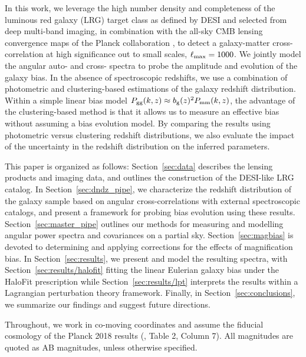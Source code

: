 In this work, we leverage the high number density and completeness of the luminous red galaxy (LRG) target class as defined by DESI and selected from deep multi-band imaging, in combination with the all-sky CMB lensing convergence maps of the Planck collaboration \citep{PlanckVIII}, to detect a galaxy-matter cross-correlation at high significance out to small scales, $\ell_{\rm max} = 1000$. We jointly model the angular auto- and cross- spectra to probe the amplitude and evolution of the galaxy bias. In the absence of spectroscopic redshifts, we use a combination of photometric and clustering-based estimations of the galaxy redshift distribution. Within a simple linear bias model $P_{\rm gg}(k,z) \approx b_{\rm g}(z)^2 P_{\rm mm}(k,z)$, the advantage of the clustering-based method is that it allows us to measure an effective bias without assuming a bias evolution model. By comparing the results using photometric versus clustering redshift distributions, we also evaluate the impact of the uncertainty in the redshift distribution on the inferred parameters.

This paper is organized as follows: Section~\ref{sec:data} describes the lensing products and imaging data, and outlines the construction of the DESI-like LRG catalog. In Section~\ref{sec:dndz_pipe}, we characterize the redshift distribution of the galaxy sample based on angular cross-correlations with external spectroscopic catalogs, and present a framework for probing bias evolution using these results. Section~\ref{sec:master_pipe} outlines our methods for measuring and modelling angular power spectra and covariances on a partial sky. Section~\ref{sec:magbias} is devoted to determining and applying corrections for the effects of magnification bias. In Section~\ref{sec:results}, we present and model the resulting spectra, with Section~\ref{sec:results/halofit} fitting the linear Eulerian galaxy bias under the HaloFit \citep{Smith++03} prescription while Section~\ref{sec:results/lpt} interprets the results within a Lagrangian perturbation theory framework. Finally, in Section~\ref{sec:conclusions}, we summarize our findings and suggest future directions. 

Throughout, we work in co-moving coordinates and assume the fiducial cosmology of the Planck 2018 results (\citealt{PlanckVI}, Table 2, Column 7). All magnitudes are quoted as AB magnitudes, unless otherwise specified.